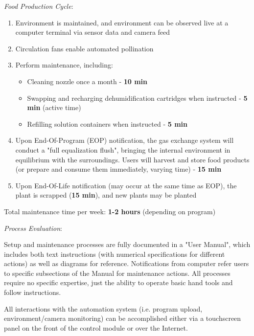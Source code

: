 \newpage

\textit{Food Production Cycle}:

\begin{enumerate}
    \item Environment is maintained, and environment can be observed live at a computer terminal via sensor data and camera feed
    \item Circulation fans enable automated pollination
    \item Perform maintenance, including:
    \begin{itemize}
        \item Cleaning nozzle once a month - \textbf{10 min}
        \item Swapping and recharging dehumidification cartridges when instructed - \textbf{5 min} (active time)
        \item Refilling solution containers when instructed - \textbf{5 min}
    \end{itemize}
    \item Upon End-Of-Program (EOP) notification, the gas exchange system will conduct a "full equalization flush", bringing the internal environment in equilibrium with the surroundings. Users will harvest and store food products (or prepare and consume them immediately, varying time) - \textbf{15 min}
    \item Upon End-Of-Life notification (may occur at the same time as EOP), the plant is scrapped (\textbf{15 min}), and new plants may be planted
\end{enumerate}

Total maintenance time per week: \textbf{1-2 hours} (depending on program)

\textit{Process Evaluation}:

Setup and maintenance processes are fully documented in a "User Manual", which includes both text instructions (with numerical specifications for different actions) as well as diagrams for reference. Notifications from computer refer users to specific subsections of the Manual for maintenance actions. All processes require no specific expertise, just the ability to operate basic hand tools and follow instructions.

All interactions with the automation system (i.e. program upload, environment/camera monitoring) can be accomplished either via a touchscreen panel on the front of the control module or over the Internet.